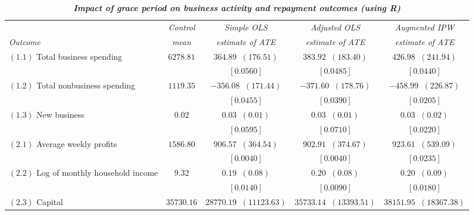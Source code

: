\begin{table}[!ht]
\begin{center}
\caption{\textit{\textbf{Impact of grace period on business activity and repayment outcomes (using R)}}}
\label{table:table_single_pvals_r}
\scriptsize \vspace{2mm}
\begin{tabular}{l|c@{\hskip 10pt}|c@{\hskip 10pt}|c@{\hskip 10pt}|c}
\hline\hline
 & \textit{Control} & \textit{Simple OLS} & \textit{Adjusted OLS} & \textit{Augmented IPW} \\ [-1mm]
 \textit{Outcome} & \textit{mean} & \textit{estimate of ATE} & \textit{estimate of ATE} & \textit{estimate of ATE} \\ \hline \hline
 $ (1.1) $ Total business spending & $ 6278.81 $  & $ 364.89 \;\; ( 176.51 ) $  & $ 383.92 \;\; ( 183.40 ) $  & $ 426.98 \;\; ( 241.94 ) $ \\ [-1mm]
 &  & $ [ \mathbf { 0.0560 }  ] $ & $ [ \mathbf { 0.0485 }  ] $ & $ [ \mathbf { 0.0440 }  ] $ \\ \hline
 $ (1.2) $ Total nonbusiness spending & $ 1119.35 $  & $ -356.08 \;\; ( 171.44 ) $  & $ -371.60 \;\; ( 178.76 ) $  & $ -458.99 \;\; ( 226.87 ) $ \\ [-1mm]
 &  & $ [ \mathbf { 0.0455 }  ] $ & $ [ \mathbf { 0.0390 }  ] $ & $ [ \mathbf { 0.0205 }  ] $ \\ \hline
 $ (1.3) $ New business & $ 0.02 $  & $ 0.03 \;\; ( 0.01 ) $  & $ 0.03 \;\; ( 0.01 ) $  & $ 0.03 \;\; ( 0.02 ) $ \\ [-1mm]
 &  & $ [ \mathbf { 0.0595 }  ] $ & $ [ \mathbf { 0.0710 }  ] $ & $ [ \mathbf { 0.0220 }  ] $ \\ \hline
\hline
 $ (2.1) $ Average weekly profits & $ 1586.80 $  & $ 906.57 \;\; ( 364.54 ) $  & $ 902.91 \;\; ( 374.67 ) $  & $ 923.61 \;\; ( 539.09 ) $ \\ [-1mm]
 &  & $ [ \mathbf { 0.0040 }  ] $ & $ [ \mathbf { 0.0040 }  ] $ & $ [ \mathbf { 0.0235 }  ] $ \\ \hline
 $ (2.2) $ Log of monthly household income & $ 9.32 $  & $ 0.19 \;\; ( 0.08 ) $  & $ 0.20 \;\; ( 0.08 ) $  & $ 0.20 \;\; ( 0.09 ) $ \\ [-1mm]
 &  & $ [ \mathbf { 0.0140 }  ] $ & $ [ \mathbf { 0.0090 }  ] $ & $ [ \mathbf { 0.0180 }  ] $ \\ \hline
 $ (2.3) $ Capital & $ 35730.16 $  & $ 28770.19 \;\; ( 11123.63 ) $  & $ 35733.14 \;\; ( 13393.51 ) $  & $ 38151.95 \;\; ( 18367.38 ) $ \\ [-1mm]

\end{tabular}
\end{center}
\end{table}
